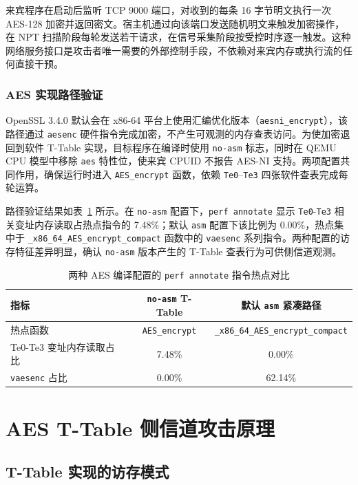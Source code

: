 来宾程序在启动后监听 TCP 9000 端口，对收到的每条 16 字节明文执行一次 AES-128 加密并返回密文。宿主机通过向该端口发送随机明文来触发加密操作，在 NPT 扫描阶段每轮发送若干请求，在信号采集阶段按受控时序逐一触发。这种网络服务接口是攻击者唯一需要的外部控制手段，不依赖对来宾内存或执行流的任何直接干预。

\subsubsection{AES 实现路径验证}

OpenSSL 3.4.0 默认会在 x86-64 平台上使用汇编优化版本（\texttt{aesni\_encrypt}），该路径通过 \texttt{aesenc} 硬件指令完成加密，不产生可观测的内存查表访问。为使加密退回到软件 T-Table 实现，目标程序在编译时使用 \texttt{no-asm} 标志，同时在 QEMU CPU 模型中移除 \texttt{aes} 特性位，使来宾 CPUID 不报告 AES-NI 支持。两项配置共同作用，确保运行时进入 \texttt{AES\_encrypt} 函数，依赖 \texttt{Te0}--\texttt{Te3} 四张软件查表完成每轮运算。

路径验证结果如表~\ref{tab:aes_path_annotate} 所示。在 \texttt{no-asm} 配置下，\texttt{perf annotate} 显示 \texttt{Te0}-\texttt{Te3} 相关变址内存读取占热点指令的 7.48\%；默认 \texttt{asm} 配置下该比例为 0.00\%，热点集中于 \texttt{\_x86\_64\_AES\_encrypt\_compact} 函数中的 \texttt{vaesenc} 系列指令。两种配置的访存特征差异明显，确认 \texttt{no-asm} 版本产生的 T-Table 查表行为可供侧信道观测。

\begin{table}[htbp]
  \centering
  \caption{两种 AES 编译配置的 \texttt{perf annotate} 指令热点对比}
  \label{tab:aes_path_annotate}
  \begin{tabular}{lcc}
    \toprule
    指标 & \texttt{no-asm} T-Table & 默认 \texttt{asm} 紧凑路径 \\
    \midrule
    热点函数 & \texttt{AES\_encrypt} & \texttt{\_x86\_64\_AES\_encrypt\_compact} \\
    Te0-Te3 变址内存读取占比 & 7.48\% & 0.00\% \\
    \texttt{vaesenc} 占比 & 0.00\% & 62.14\% \\
    \bottomrule
  \end{tabular}
\end{table}

\section{AES T-Table 侧信道攻击原理}
\label{sec:aes_attack_principle}

\subsection{T-Table 实现的访存模式}

